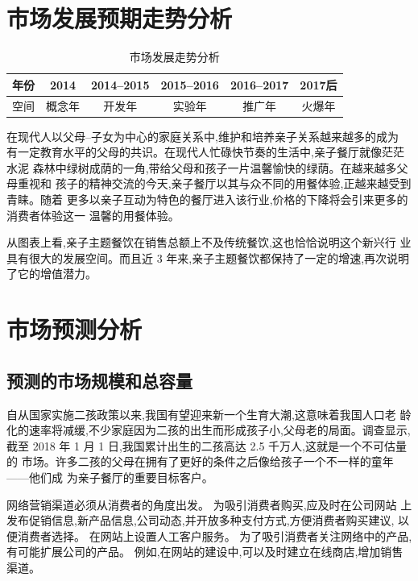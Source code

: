 \section{市场发展预期走势分析}
\begin{table}[htbp]
        \centering
        \caption{市场发展走势分析}
        \label{fig:market-trend}
        \begin{tabular}{|c|c|c|c|c|c|}
                \hline
                年份 & 2014 & 2014--2015 & 2015--2016 & 2016--2017 & 2017后\\
                \hline
                空间 & 概念年 & 开发年 & 实验年 & 推广年 & 火爆年\\
                \hline
        \end{tabular}
\end{table}

在现代人以父母--子女为中心的家庭关系中,维护和培养亲子关系越来越多的成为
有一定教育水平的父母的共识。在现代人忙碌快节奏的生活中,亲子餐厅就像茫茫水泥
森林中绿树成荫的一角,带给父母和孩子一片温馨愉快的绿荫。在越来越多父母重视和
孩子的精神交流的今天,亲子餐厅以其与众不同的用餐体验,正越来越受到青睐。随着
更多以亲子互动为特色的餐厅进入该行业,价格的下降将会引来更多的消费者体验这一
温馨的用餐体验。

从图表上看,亲子主题餐饮在销售总额上不及传统餐饮,这也恰恰说明这个新兴行
业具有很大的发展空间。而且近 3 年来,亲子主题餐饮都保持了一定的增速,再次说明
了它的增值潜力。

\section{市场预测分析}

\subsection{预测的市场规模和总容量}
自从国家实施二孩政策以来,我国有望迎来新一个生育大潮,这意味着我国人口老
龄化的速率将减缓,不少家庭因为二孩的出生而形成孩子小,父母老的局面。调查显示,
截至 2018 年 1 月 1 日,我国累计出生的二孩高达 2.5 千万人,这就是一个不可估量的
市场。许多二孩的父母在拥有了更好的条件之后像给孩子一个不一样的童年——他们成
为亲子餐厅的重要目标客户。

网络营销渠道必须从消费者的角度出发。 为吸引消费者购买,应及时在公司网站
上发布促销信息,新产品信息,公司动态,并开放多种支付方式,方便消费者购买建议,
以便消费者选择。 在网站上设置人工客户服务。 为了吸引消费者关注网络中的产品,
有可能扩展公司的产品。 例如,在网站的建设中,可以及时建立在线商店,增加销售
渠道。

